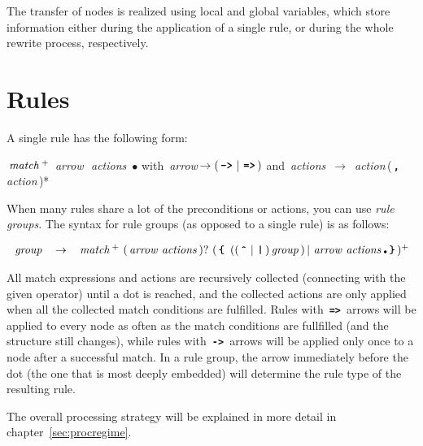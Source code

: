 \documentclass[11pt,a4paper]{report}
\begin{document}
The transfer of nodes is realized using local and global variables, which
store information either during the application of a single rule, or during
the whole rewrite process, respectively.

\chapter{Rules}

A single rule has the following form:

\newcommand{\nt}[1]{\,\mbox{\emph{#1}}\,}
\newcommand{\tok}[1]{\,\mbox{\texttt{\textbf{#1}}}\,}
\newcommand{\id}{\,\mbox{\texttt{ID}}\,}
\newcommand{\BAR}{\,|\,}
\begin{center}

$\nt{match}^{+}$ \nt{arrow} \nt{actions} {\tiny$\bullet$}
\hspace*{1.2em} with
\nt{arrow}$\rightarrow (\tok{->}\BAR\tok{=>})$ and
\nt{actions} $\rightarrow$ \mbox{\nt{action}(\tok{,}\nt{action})*}
\end{center}

When many rules share a lot of the preconditions or actions, you can use
\emph{rule groups}. The syntax for rule groups (as opposed to a single rule) is
as follows:

\[
\begin{array}{lcl}
\nt{group} & \rightarrow &
   \nt{match}^{+}\  (\nt{arrow} \nt{actions} )?
   \ (\tok{\{}
   \ ((\tok{\^{}} \BAR \tok{|}) \nt{group})
   \BAR
   \mbox{\nt{arrow}} \nt{actions} \mbox{\tiny$\bullet$}
   \tok{\}})^{+}\\
\end{array}
\]

All match expressions and actions are recursively collected (connecting with
the given operator) until a dot is reached, and the collected actions are only
applied when all the collected match conditions are fulfilled. Rules with
\tok{=>} arrows will be applied to every node as often as the match conditions
are fullfilled (and the structure still changes), while rules with \tok{->}
arrows will be applied only once to a node after a successful match. In a rule
group, the arrow immediately before the dot (the one that is most deeply
embedded) will determine the rule type of the resulting rule.

The overall processing strategy will be explained in more detail in chapter~\ref{sec:procregime}.
\end{document}
